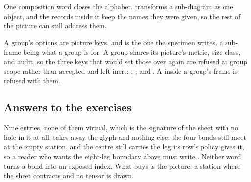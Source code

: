 \begin{tnrefusal}[
  caption={strict setup rejects a sugar spelling},
  index={\tnkey{sandwich} is sugar for
    \tnkey{rows=}\tnval{\{ket,op,bra\}}.  Under \tnval{strict} the
    expansion is not performed; the spelling is refused and named.},
  diagnostic={[TKZ-LANG-STRICT] 'sandwich' is sugar and
    \textbackslash tnset\{strict\} is active.}]
\begin{tenkz}[sandwich, cols=1]
   \\  \\ 
\end{tenkz}
\end{tnrefusal}

One composition word closes the alphabet.   transforms a
sub-diagram as one object, and the records inside it keep the names they
were given, so the rest of the picture can still address them.

\begin{tnexample}[
  caption={a grouped sub-diagram},
  index={The group is one object of its picture.  Its member keeps the
    name \tnval{g} and is reachable from outside the group by that name.},
  signature={kernel-boundary|signature=}]
\begin{tenkz}[rows={ket}, cols=1, bonds=none]
\end{tenkz}
\end{tnexample}

A group's options are picture keys, and  is the one the
specimen writes, a sub-frame being what a group is for.  A group shares
its picture's metric, size class, and audit, so the three keys that would
set those over again are refused at group scope rather than accepted and
left inert: , , and .  A
 inside a group's frame is refused with them.

\subsection{Answers to the exercises}

 Nine entries, none of them virtual, which is the
signature of the sheet with no hole in it at all.   takes
away the glyph and nothing else: the four bonds still meet at the empty
station, and the centre still carries the leg its row's policy gives it,
so a reader who wants the eight-leg boundary above must write
.  Neither word turns a bond into an exposed index.  What
 buys is the picture: a station where the sheet contracts and
no tensor is drawn.
